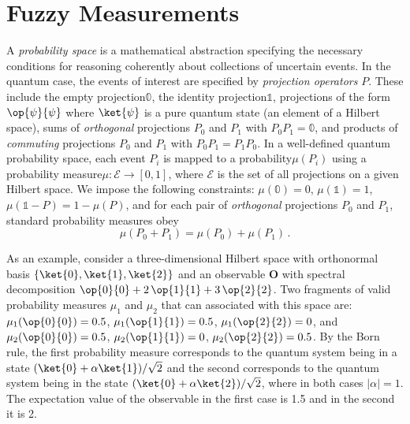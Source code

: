 \documentclass[english,reprint, aps, prl,superscriptaddress, showpacs,
showkeys, longbibliography, amsmath, amssymb]{revtex4-1}
\theoremstyle{plain}
\theoremstyle{definition}
\newcommand{\events}{\ensuremath{\mathcal{E}}}
\newcommand{\proj}[1]{\op{#1}{#1}}
\newcommand{\nb}{\nolinebreak[1] }
\begin{document}
\section{Fuzzy Measurements}
 \label{sec:fuzzy}
A \emph{probability space} is a mathematical abstraction specifying
the necessary conditions for reasoning coherently about collections of
uncertain events\nb\cite{Kolmogorov1950,544199,Griffiths2003,Grabisch2016}. In the quantum case, the
events of interest are specified by \emph{projection operators}
$P$. These include the empty projection\nb$\mathbb{0}$, the identity
projection\nb$\mathbb{1}$, projections of the form $\proj{\psi}$ where
$\ket{\psi}$ is a pure quantum state (an element of a Hilbert space),
sums of \emph{orthogonal} projections $P_0$ and $P_1$ with
$P_0P_1=\mathbb{0}$, and products of \emph{commuting} projections
$P_0$ and $P_1$ with $P_0P_1=P_1P_0$. In a well-defined quantum
probability
space\nb\cite{10.2307/2308516,gleason1957,Redhead1987-REDINA,Maassen2010},
each event $P_{i}$ is mapped to a probability\nb$\mu(P_{i})$ using
a probability measure\nb$\mu:\events\rightarrow[0,1]$, where $\events$
is the set of all projections on a given Hilbert space. We impose
the following constraints: $\mu(\mathbb{0})=0$, $\mu(\mathbb{1})=1$,
$\mu\left(\mathbb{1}-P\right)=1-\mu\left(P\right)$, and for each pair
of \emph{orthogonal} projections $P_{0}$ and $P_{1}$, standard probability
measures obey
\begin{equation}
{\mu}\left(P_{0}+P_{1}\right)={\mu}\left(P_{0}\right)+{\mu}\left(P_{1}\right)\,.\label{eq:QuantumProbability-Addition}
\end{equation}

As an example, consider a three-dimensional Hilbert space with
orthonormal basis $\{\ket{0},\ket{1},\ket{2}\}$ and an observable
$\mathbf{O}$ with spectral decomposition
$\proj{0} + 2\,\proj{1} + 3\,\proj{2}$. Two fragments of valid
probability measures $\mu_1$ and $\mu_2$ that can associated with this
space are: $\mu_1(\proj{0}) = 0.5$, $\mu_1(\proj{1}) = 0.5$,
$\mu_1(\proj{2}) = 0$, and $\mu_2(\proj{0}) = 0.5$,
$\mu_2(\proj{1}) = 0$, $\mu_2(\proj{2}) = 0.5$. By the Born rule, the
first probability measure corresponds to the quantum system being in a
state $(\ket{0}+\alpha\ket{1})/\sqrt{2}$ and the second corresponds to
the quantum system being in the state
$(\ket{0}+\alpha\ket{2})/\sqrt{2}$, where in both cases
$|\alpha|=1$. The expectation value of the observable in the first
case is 1.5 and in the second it is 2.
\end{document}
